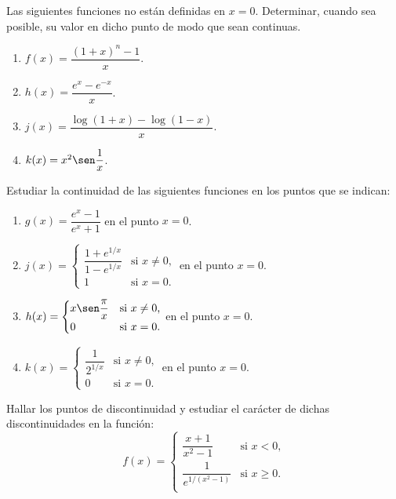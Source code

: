 
{Las siguientes funciones no están definidas en $x=0$.
Determinar, cuando sea posible, su valor en dicho punto de modo que
sean continuas.
\begin{multicols}{2}
\begin{enumerate}
\item  $f(x)=\dfrac{(1+x)^n-1}{x}$.
\item  $h(x)=\dfrac{e^x-e^{-x}}{x}$.
\item  $j(x)=\dfrac{\log(1+x)-\log(1-x)}{x}$.
\item  $k(x)=x^2\sen\dfrac{1}{x}$.
\end{enumerate}
\end{multicols}
}


{Estudiar la continuidad de las siguientes funciones en los puntos que se indican:
\begin{enumerate}
\item  $g(x)=\dfrac{e^x-1}{e^x+1}$ \quad en el punto $x=0$.
\item  $j(x)=
\begin{cases}
\dfrac{1+e^{1/x}}{1-e^{1/x}} & \mbox{si $x\neq 0$,} \\
1 &  \mbox{si $x=0$.}
\end{cases}$
\quad
en el punto $x=0$.
\item  $h(x)=
\begin{cases}
x\sen\dfrac{\pi}{x} & \mbox{si $x\neq 0$,} \\
0 & \mbox{si $x=0$.}
\end{cases}$
\quad
en el punto $x=0$.
\item  $k(x)=
\begin{cases}
\dfrac{1}{2^{1/x}} &  \mbox{si $x\neq 0$,} \\
0 & \mbox{si $x=0$.}
\end{cases}$
\quad
en el punto $x=0$.
\end{enumerate}
}


{Hallar los puntos de discontinuidad y estudiar el carácter de dichas discontinuidades en la función:
\[
f(x)= 
\begin{cases}
\dfrac{x+1}{x^2-1} & \mbox{si $x<0$,} \\
\dfrac{1}{e^{1/(x^2-1)}} & \mbox{si $x\geq 0$.} \\
\end{cases} 
\]
}


